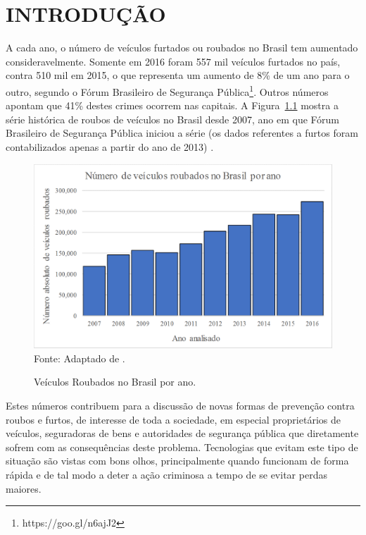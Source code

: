 \chapter{INTRODUÇÃO}

A cada ano, o número de veículos furtados ou roubados no Brasil tem aumentado consideravelmente. Somente em 2016 foram 557 mil veículos furtados no país, contra 510 mil em 2015, o que representa um aumento de 8\% de um ano para o outro, segundo o Fórum Brasileiro de Segurança Pública\footnote[1]{https://goo.gl/n6ajJ2}. Outros números apontam que 41\% destes crimes ocorrem nas capitais. A Figura~\ref{fig:roubos} mostra a série histórica de roubos de veículos no Brasil desde 2007, ano em que Fórum Brasileiro de Segurança Pública iniciou a série (os dados referentes a furtos foram contabilizados apenas a partir do ano de 2013) \cite{fbsp2017}.

\begin{figure}[!htb]
\centering
\caption{Veículos Roubados no Brasil por ano.} %
\includegraphics[scale=0.4]{roubosporano.png}\\  %
{\small Fonte: Adaptado de .} %
\label{fig:roubos} %
\end{figure}

Estes números contribuem para a discussão de novas formas de prevenção contra roubos e furtos, de interesse de toda a sociedade, em especial proprietários de veículos, seguradoras de bens e autoridades de segurança pública que diretamente sofrem com as consequências deste problema. Tecnologias que evitam este tipo de situação são vistas com bons olhos, principalmente quando funcionam de forma rápida e de tal modo a deter a ação criminosa a tempo de se evitar perdas maiores.

